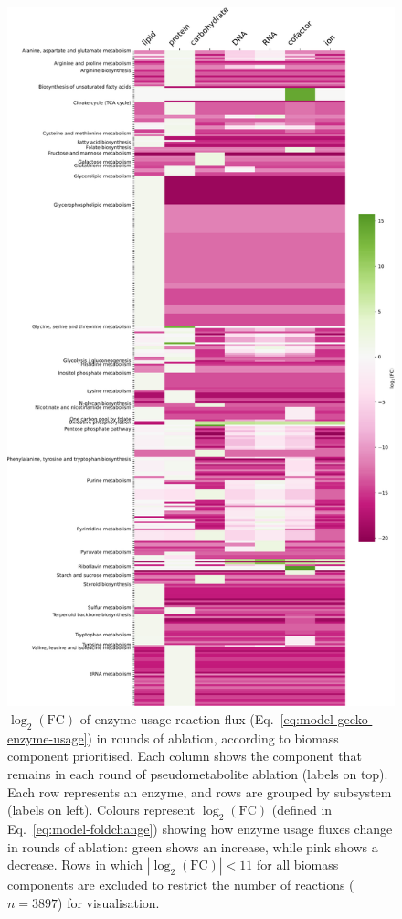 \begin{figure}
  \centering
  \includegraphics[width=.8\linewidth]{allocation_fc}
  \caption{
    $\log_{2}(\mathrm{FC})$ of enzyme usage reaction flux (Eq.\ \ref{eq:model-gecko-enzyme-usage}) in rounds of ablation, according to biomass component prioritised.
    Each column shows the component that remains in each round of pseudometabolite ablation (labels on top).
    Each row represents an enzyme, and rows are grouped by subsystem (labels on left).
    Colours represent $\log_{2}(\mathrm{FC})$ (defined in Eq.\ \ref{eq:model-foldchange}) showing how enzyme usage fluxes change in rounds of ablation: green shows an increase, while pink shows a decrease.
    Rows in which $|\log_{2}(\mathrm{FC})| < 11$ for all biomass components are excluded to restrict the number of reactions ($n = \num{3897}$) for visualisation.
  }
  \label{fig:model-ablate-enz-use}
\end{figure}

